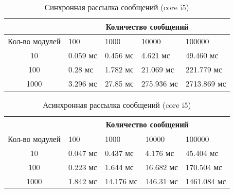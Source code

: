\begin{table}[htb]
    \caption{\label{tab:core_rrc}Синхронная рассылка сообщений (core i5)}
    \begin{center}
        \begin{tabularx}{\textwidth}{|c|X|X|X|X|}
            \hline
            & \multicolumn{4}{|c|}{Количество сообщений} \\
            \hline
            Кол-во модулей & 100   & 1000   & 10000   & 100000   \\
            \hline
            10             & 0.059 мс  & 0.456 мс   & 4.621 мс   & 49.460 мс   \\
            \hline
            100            & 0.28 мс  & 1.782 мс  & 21.069 мс  & 221.779 мс  \\
            \hline
            1000           & 3.296 мс & 27.85 мс & 275.936 мс & 2713.869 мс \\
            \hline
        \end{tabularx}
    \end{center}
\end{table}

\begin{table}[htb]
    \caption{\label{tab:core_oldrrc}Асинхронная рассылка сообщений (core i5)}
    \begin{center}
        \begin{tabularx}{\textwidth}{|c|X|X|X|X|}
            \hline
            & \multicolumn{4}{|c|}{Количество сообщений} \\
            \hline
            Кол-во модулей & 100   & 1000   & 10000   & 100000   \\
            \hline
            10             & 0.047 мс  & 0.437 мс   & 4.176 мс   & 45.404 мс   \\
            \hline
            100            & 0.223 мс  & 1.644 мс  & 16.682 мс  & 170.504 мс  \\
            \hline
            1000           & 1.842 мс & 14.176 мс & 146.31 мс & 1461.084 мс \\
            \hline
        \end{tabularx}
    \end{center}
\end{table}

